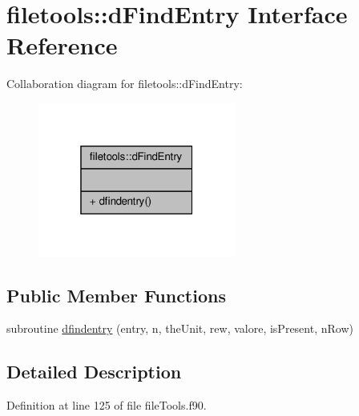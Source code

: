 \hypertarget{interfacefiletools_1_1d_find_entry}{\section{filetools\-:\-:d\-Find\-Entry Interface Reference}
\label{interfacefiletools_1_1d_find_entry}
}


Collaboration diagram for filetools\-:\-:d\-Find\-Entry\-:\nopagebreak
\begin{figure}[H]
\begin{center}
\leavevmode
\includegraphics[width=184pt]{interfacefiletools_1_1d_find_entry__coll__graph}
\end{center}
\end{figure}
\subsection*{Public Member Functions}
\begin{DoxyCompactItemize}
\item 
subroutine \hyperlink{interfacefiletools_1_1d_find_entry_a5ec867262eca2566d523b83684eb69fa}{dfindentry} (entry, n, the\-Unit, rew, valore, is\-Present, n\-Row)
\end{DoxyCompactItemize}


\subsection{Detailed Description}


Definition at line 125 of file file\-Tools.\-f90.



